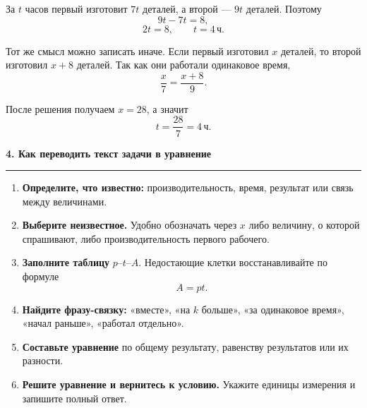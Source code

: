 \documentclass[a4paper,12pt]{article}
\newcommand{\lessonsection}[1]{%
  \vspace{0.35em}
  {\Large\bfseries\textcolor{darkaccent}{#1}}\par
  \vspace{0.2em}
  {\color{accent}\rule{\linewidth}{0.6pt}}\par
  \vspace{0.4em}
}
\newcommand{\unit}[1]{\,\text{#1}}
\begin{document}
За $t$ часов первый изготовит $7t$ деталей,
а второй --- $9t$ деталей. Поэтому
\[
9t-7t=8,
\]
\[
2t=8,
\qquad
\boxed{t=4\unit{ч}}.
\]

Тот же смысл можно записать иначе.
Если первый изготовил $x$ деталей, то второй изготовил $x+8$ деталей.
Так как они работали одинаковое время,
\[
\frac{x}{7}=\frac{x+8}{9}.
\]

После решения получаем $x=28$, а значит
\[
t=\frac{28}{7}=4\unit{ч}.
\]

\lessonsection{4. Как переводить текст задачи в уравнение}

\begin{enumerate}
  \item
  \textbf{Определите, что известно:}
  производительность, время, результат или связь между величинами.

  \item
  \textbf{Выберите неизвестное.}
  Удобно обозначать через $x$ либо величину, о которой спрашивают,
  либо производительность первого рабочего.

  \item
  \textbf{Заполните таблицу} $p$--$t$--$A$.
  Недостающие клетки восстанавливайте по формуле
  \[
  A=pt.
  \]

  \item
  \textbf{Найдите фразу-связку:}
  «вместе», «на $k$ больше», «за одинаковое время»,
  «начал раньше», «работал отдельно».

  \item
  \textbf{Составьте уравнение}
  по общему результату, равенству результатов
  или их разности.

  \item
  \textbf{Решите уравнение и вернитесь к условию.}
  Укажите единицы измерения и запишите полный ответ.
\end{enumerate}

\begin{center}
\end{center}
\end{document}
